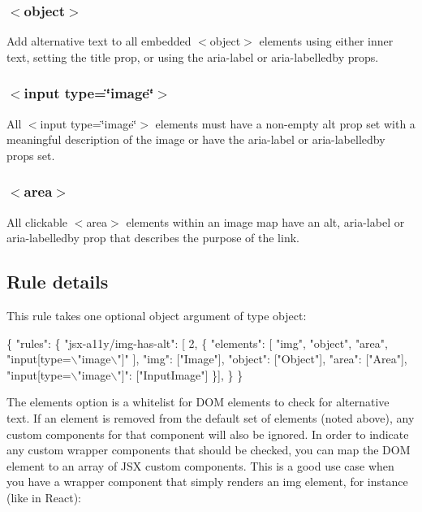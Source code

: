 \subsubsection*{{\ttfamily $<$object$>$}}

Add alternative text to all embedded {\ttfamily $<$object$>$} elements using either inner text, setting the {\ttfamily title} prop, or using the {\ttfamily aria-\/label} or {\ttfamily aria-\/labelledby} props.

\subsubsection*{{\ttfamily $<$input type=\char`\"{}image\char`\"{}$>$}}

All {\ttfamily $<$input type=\char`\"{}image\char`\"{}$>$} elements must have a non-\/empty {\ttfamily alt} prop set with a meaningful description of the image or have the {\ttfamily aria-\/label} or {\ttfamily aria-\/labelledby} props set.

\subsubsection*{{\ttfamily $<$area$>$}}

All clickable {\ttfamily $<$area$>$} elements within an image map have an {\ttfamily alt}, {\ttfamily aria-\/label} or {\ttfamily aria-\/labelledby} prop that describes the purpose of the link.

\subsection*{Rule details}

This rule takes one optional object argument of type object\+:


\begin{DoxyCode}
\{
    "rules": \{
        "jsx-a11y/img-has-alt": [ 2, \{
            "elements": [ "img", "object", "area", "input[type=\(\backslash\)"image\(\backslash\)"]" ],
            "img": ["Image"],
            "object": ["Object"],
            "area": ["Area"],
            "input[type=\(\backslash\)"image\(\backslash\)"]": ["InputImage"]
          \}],
    \}
\}
\end{DoxyCode}


The {\ttfamily elements} option is a whitelist for D\+OM elements to check for alternative text. If an element is removed from the default set of elements (noted above), any custom components for that component will also be ignored. In order to indicate any custom wrapper components that should be checked, you can map the D\+OM element to an array of J\+SX custom components. This is a good use case when you have a wrapper component that simply renders an {\ttfamily img} element, for instance (like in React)\+:


